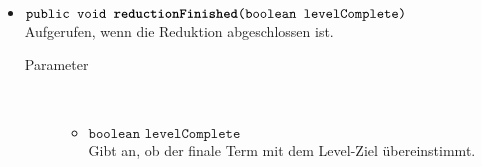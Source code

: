 \begin{description}
\begin{itemize}
		\item $\texttt{public void \textbf{reductionFinished}(boolean levelComplete)}$ \\ Aufgerufen, wenn die Reduktion abgeschlossen ist.
		\begin{description}
			\item[Parameter] \hfill \\
			\vspace{-.8cm}
			\begin{itemize}
				\item $\texttt{boolean levelComplete}$ \\ Gibt an, ob der finale Term mit dem Level-Ziel übereinstimmt.
			\end{itemize}
		\end{description}
	\end{itemize}
\end{description}
